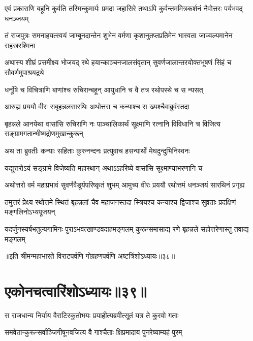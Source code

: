 \fourlineindentedshloka
{एवं प्रकाराणि बहूनि कुर्वति}
{तस्मिन्कुमार्यः प्रमदा जहासिरे}
{तथाऽपि कुर्वन्तममित्रकर्शनं}
{नैवोत्तरः पर्यभवद् धनञ्जयम्}


\fourlineindentedshloka
{तं राजपुत्रः समनाहयत्स्वयं}
{जाम्बूनदान्तेन शुभेन वर्मणा}
{कृशानुतप्तप्रतिमेन भास्वता}
{जाज्वल्यमानेन सहस्ररश्मिना}


\fourlineindentedshloka
{अथास्य शीघ्रं प्रसमीक्ष्य भोजयद्}
{रथे हयान्काञ्चनजालसंवृतान्}
{सुवर्णजालान्तरयोक्तभूषणं}
{सिंहं च सौवर्णमुपाश्रयद्रथे}


\twolineshloka
{धनूंषि च विचित्राणि बाणांश्च रुचिरान्बहून्}
{आयुधानि च वै तत्र रथोपस्थे च स न्यसत्}


\twolineshloka
{आरुह्य प्रययौ वीरः सबृहन्नलसारथिः}
{अथोत्तरा च कन्याश्च स ख्यश्चैवाब्रुवंस्तदा}


\threelineshloka
{बृहन्नले आनयेथा वासांसि रुचिराणि नः}
{पाञ्चालिकार्थं सूक्ष्माणि रत्नानि विविधानि च}
{विजित्य सङ्ग्रामगतान्भीष्मद्रोणमुखान्कुरून्}


\twolineshloka
{अथ ता ब्रुवतीः कन्याः सहिताः कुरुनन्दनः}
{प्रत्युवाच हसन्पार्थो मेघदुन्दुभिनिस्वनः}


\twolineshloka
{यद्युत्तरोऽयं सङ्ग्रामे विजेष्यति महारथान्}
{अथाऽऽहरिष्ये वासांसि सूक्ष्माण्याभरणानि च}



\fourlineindentedshloka
{अथोत्तरो वर्म महाप्रभावं}
{सुवर्णवैडूर्यपरिष्कृतं शुभम्}
{आमुच्य वीरः प्रययौ रथोत्तमं}
{धनञ्जयं सारथिनं प्रगृह्य}


\fourlineindentedshloka
{तमुत्तरं प्रेक्ष्य रथोत्तमे स्थितं}
{बृहन्नलां चैव महाजनस्तदा}
{स्त्रियश्च कन्याश्च द्विजाश्च सुव्रताः}
{प्रदक्षिणं मङ्गलिनोऽभ्यपूजयन्}


\fourlineindentedshloka
{यदर्जुनस्यर्षभतुल्यगामिनः}
{पुराऽभवत्खाण्डवदाहमङ्गलम्}
{कुरून्समासाद्य रणे बृहन्नले}
{सहोत्तरेणास्तु तवाद्य मङ्गलम्}

॥इति श्रीमन्महाभारते विराटपर्वणि गोग्रहणपर्वणि अष्टत्रिंशोऽध्यायः॥३८॥

\chapter{एकोनचत्वारिंशोऽध्यायः॥३९॥}

\twolineshloka
{स राजधान्य निर्याय वैराटिरकुतोभयः}
{प्रयाहीत्यब्रवीत्सूतं यत्र ते कुरवो गताः}


\twolineshloka
{समवेतान्कुरून्सर्वाञ्जिगीषूनवजित्य वै}
{गाश्चैताः क्षिप्रमादाय पुनरेष्याम्यहं पुरम्}


